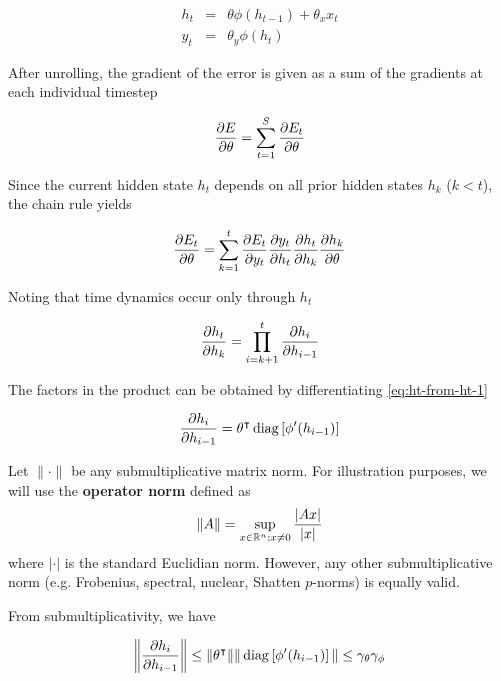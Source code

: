 \begin{eqnarray}
    h_t &=& \theta \phi(h_{t-1}) + \theta_x x_t \label{eq:ht-from-ht-1}\\
    y_t &=& \theta_y \phi(h_t)
\end{eqnarray}

After unrolling, the gradient of the error is given as a sum of the gradients
at each individual timestep

\begin{equation}
    \frac{\partial E}{\partial \theta} = \sum_{t=1}^S \frac{\partial E_t}{\partial \theta}
\end{equation}

Since the current hidden state $h_t$ depends on all prior hidden states $h_k$ ($k < t$),
the chain rule yields

\begin{equation}
    \frac{\partial E_t}{\partial \theta} = \sum_{k=1}^t \frac{\partial E_t}{\partial y_t} \frac{\partial y_t}{\partial h_t} \frac{\partial h_t}{\partial h_k} \frac{\partial h_k}{\partial \theta}
\end{equation}

Noting that time dynamics occur only through $h_t$

\begin{equation}
    \label{eq:prod-hi}
    \frac{\partial h_t}{\partial h_k} = \prod_{i=k+1}^t \frac{\partial h_i}{\partial h_{i-1}}
\end{equation}

The factors in the product can be obtained by differentiating \autoref{eq:ht-from-ht-1}

\begin{equation}
    \frac{\partial h_i}{\partial h_{i-1}} = \theta^\intercal \operatorname*{diag}\left[ \phi'(h_{i-1}) \right]
\end{equation}

Let $\|\cdot\|$ be any submultiplicative matrix norm. For illustration purposes, we will use the
\textbf{operator norm} defined as
\begin{equation}
    \| A \| = \sup_{x \in \mathbb{R}^n; x \neq 0} \frac{|A x|}{|x|}
\end{equation}
where $|\cdot|$ is the standard Euclidian norm. However, any other submultiplicative norm
(e.g. Frobenius, spectral, nuclear, Shatten $p$-norms) is equally valid.

From submultiplicativity, we have

\begin{equation}
    \left\| \frac{\partial h_i}{\partial h_{i-1}} \right\|
    \leq \|\theta^\intercal\| \| \operatorname*{diag}\left[ \phi'(h_{i-1}) \right] \|
    \leq \gamma_{\theta} \gamma_\phi
\end{equation}


